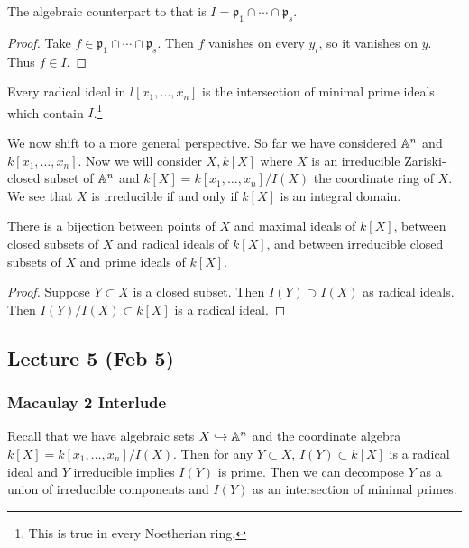 \documentclass[twoside, 10pt]{article}
\begin{document}
    \begin{rmk} The algebraic counterpart to that is $I = \mathfrak{p}_1 \cap
        \cdots \cap \mathfrak{p}_s$.  \begin{proof} Take $f \in \mathfrak{p}_1
            \cap \cdots \cap \mathfrak{p}_s$. Then $f$ vanishes on every $y_i$,
            so it vanishes on $y$. Thus $f \in I$.  \end{proof} \end{rmk}

    \begin{thm} Every radical ideal in $l[x_1, \ldots, x_n]$ is the
    intersection of minimal prime ideals which contain $I$.\footnote{This is
true in every Noetherian ring.} \end{thm}

    We now shift to a more general perspective. So far we have considered
    $\mathbb{A}^n$ and $k[x_1, \ldots, x_n]$. Now we will consider $X,k[X]$ where $X$
    is an irreducible Zariski-closed subset of $\mathbb{A}^n$ and $k[X] = k[x_1,
    \ldots, x_n]/I(X)$ the coordinate ring of $X$. We see that $X$ is
    irreducible if and only if $k[X]$ is an integral domain.

    \begin{thm} There is a bijection between
        points of $X$ and maximal ideals of $k[X]$, between closed subsets of
        $X$ and radical ideals of $k[X]$, and between irreducible closed
        subsets of $X$ and prime ideals of $k[X]$.  \begin{proof} Suppose $Y
        \subset X$ is a closed subset. Then $I(Y) \supset I(X)$ as radical
    ideals. Then $I(Y)/I(X) \subset k[X]$ is a radical ideal.  \end{proof}
\end{thm}

    \subsection{Lecture 5 (Feb 5)}

    \subsubsection{Macaulay 2 Interlude} Recall that we have algebraic sets $X
    \hookrightarrow \mathbb{A}^n$ and the coordinate algebra $k[X] = k[x_1, \ldots,
    x_n]/I(X)$. Then for any $Y \subset X$, $I(Y) \subset k[X]$ is a radical
    ideal and $Y$ irreducible implies $I(Y)$ is prime. Then we can decompose
    $Y$ as a union of irreducible components and $I(Y)$ as an intersection of
    minimal primes.
\end{document}
